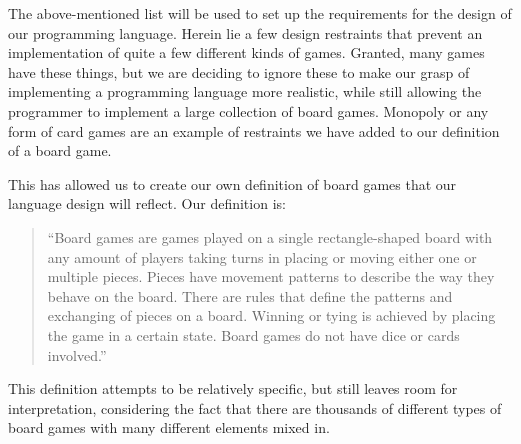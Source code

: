 The above-mentioned list will be used to set up the requirements for the design of our programming language. 
Herein lie a few design restraints that prevent an implementation of quite a few different kinds of games. 
Granted, many games have these things, but we are deciding to ignore these to make our grasp of implementing a programming language more realistic, while still allowing the programmer to implement a large collection of board games. 
Monopoly or any form of card games are an example of restraints we have added to our definition of a board game.

This has allowed us to create our own definition of board games that our language design will reflect. Our definition is:
\begin{quote}
``Board games are games played on a single rectangle-shaped board with any amount of players taking turns in placing or moving either one or multiple pieces. Pieces have movement patterns to describe the way they behave on the board. There are rules that define the patterns and exchanging of pieces on a board. Winning or tying is achieved by placing the game in a certain state. Board games do not have dice or cards involved.''
\end{quote}

This definition attempts to be relatively specific, but still leaves room for interpretation, considering the fact that there are thousands of different types of board games with many different elements mixed in.